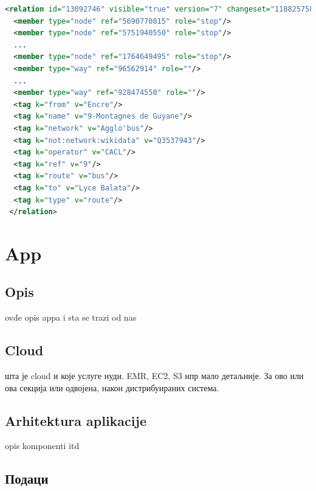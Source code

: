 \documentclass[12pt,oneside]{memoir}
\begin{document}
\begin{lstlisting}[language=XML, caption={\textit{XML} запис \textit{OSM} релације која представља аутобуску линију}, label={lst:osm_relation_xml}]
<relation id="13092746" visible="true" version="7" changeset="118825758" timestamp="2022-03-23T15:05:48Z" user="" uid="">
  <member type="node" ref="5690770815" role="stop"/>
  <member type="node" ref="5751940550" role="stop"/>
  ...
  <member type="node" ref="1764649495" role="stop"/>
  <member type="way" ref="96562914" role=""/>
  ...
  <member type="way" ref="928474550" role=""/>
  <tag k="from" v="Encre"/>
  <tag k="name" v="9-Montagnes de Guyane"/>
  <tag k="network" v="Agglo'bus"/>
  <tag k="not:network:wikidata" v="Q3537943"/>
  <tag k="operator" v="CACL"/>
  <tag k="ref" v="9"/>
  <tag k="route" v="bus"/>
  <tag k="to" v="Lyce Balata"/>
  <tag k="type" v="route"/>
 </relation>
\end{lstlisting}


\chapter{App}
\label{chp:app}

\section{Opis}
\label{sec:opis}

ovde opis appa i sta se trazi od nas

\section{Cloud}
\label{sec:cloud}

шта је cloud и које услуге нуди. EMR, EC2, S3 нпр мало детаљније. За ово или ова секција или одвојена, након дистрибуираних система.

\section{Arhitektura aplikacije}
\label{sec:app_aphi}

opis komponenti itd

\section{Подаци}
\label{sec:osm_spark_podaci}
\end{document}
